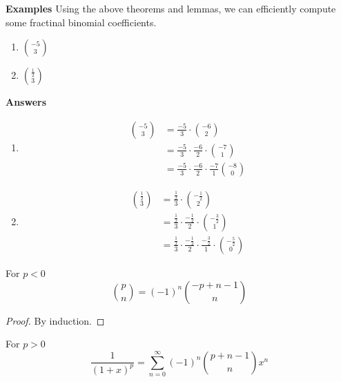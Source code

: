 \noindent \textbf{Examples}
Using the above theorems and lemmas, we can efficiently compute some fractinal binomial coefficients.
\begin{enumerate}
    \item ${-5 \choose 3}$
    \item ${\frac{1}{2} \choose 3}$
\end{enumerate}
\textbf{Answers}
\begin{enumerate}
    \item \begin{equation}
        \begin{split}
            {-5 \choose 3} &= \frac{-5}{3}\cdot{-6 \choose 2}\\
            &= \frac{-5}{3}\cdot\frac{-6}{2}\cdot{-7 \choose 1}\\
            &= \frac{-5}{3}\cdot\frac{-6}{2}\cdot\frac{-7}{1}{-8 \choose 0}
        \end{split}
    \end{equation}
    \item \begin{equation}
        \begin{split}
            {\frac{1}{2} \choose 3} &= \frac{\frac{1}{2}}{3} \cdot {-\frac{1}{2} \choose 2}\\
            &= \frac{\frac{1}{2}}{3}\cdot\frac{-\frac{1}{2}}{2}\cdot{-\frac{3}{2} \choose 1}\\
            &= \frac{\frac{1}{2}}{3}\cdot\frac{-\frac{1}{2}}{2}\cdot\frac{-\frac{3}{2}}{1}\cdot{-\frac{5}{2} \choose 0}
        \end{split}
    \end{equation}
\end{enumerate}

\begin{theorem}
    For $p<0$ $${p \choose n}= (-1)^n{-p+n-1 \choose n}$$
\end{theorem}
\begin{proof}
    By induction.
\end{proof}

\begin{corollary}
    For $p>0$ $$\frac{1}{(1+x)^p}=\sum_{n=0}^{\infty}(-1)^n{p+n-1 \choose n}x^n$$
\end{corollary}

